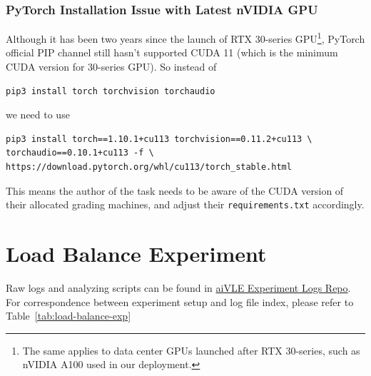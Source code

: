 \subsubsection{PyTorch Installation Issue with Latest nVIDIA GPU}
Although it has been two years since the launch of RTX 30-series GPU\footnote{The same applies to data center GPUs launched after RTX 30-series, such as nVIDIA A100 used in our deployment.}, PyTorch official PIP channel still hasn't supported CUDA 11 (which is the minimum CUDA version for 30-series GPU). So instead of 
\begin{code}
\begin{verbatim}
pip3 install torch torchvision torchaudio
\end{verbatim}
\end{code}
we need to use
\begin{code}
\begin{verbatim}
pip3 install torch==1.10.1+cu113 torchvision==0.11.2+cu113 \
torchaudio==0.10.1+cu113 -f \
https://download.pytorch.org/whl/cu113/torch_stable.html
\end{verbatim}
\end{code}

This means the author of the task needs to be aware of the CUDA version of their allocated grading machines, and adjust their \texttt{requirements.txt} accordingly.

\section{Load Balance Experiment}
\label{s:load-balance-exp}
Raw logs and analyzing scripts can be found in \href{https://github.com/edu-ai/aivle-experiment-logs}{aiVLE Experiment Logs Repo}. For correspondence between experiment setup and log file index, please refer to Table~\ref{tab:load-balance-exp}

